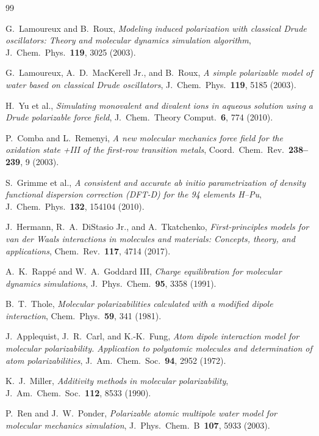 \documentclass[11pt,letterpaper]{article}
\begin{document}

\begin{thebibliography}{99}

G.~Lamoureux and B.~Roux,
\textit{Modeling induced polarization with classical Drude oscillators: Theory and molecular dynamics simulation algorithm},
J.~Chem.~Phys.~\textbf{119}, 3025 (2003).

G.~Lamoureux, A.~D.~MacKerell Jr., and B.~Roux,
\textit{A simple polarizable model of water based on classical Drude oscillators},
J.~Chem.~Phys.~\textbf{119}, 5185 (2003).

H.~Yu et al.,
\textit{Simulating monovalent and divalent ions in aqueous solution using a Drude polarizable force field},
J.~Chem.~Theory Comput.~\textbf{6}, 774 (2010).

P.~Comba and L.~Remenyi,
\textit{A new molecular mechanics force field for the oxidation state +III of the first-row transition metals},
Coord.~Chem.~Rev.~\textbf{238--239}, 9 (2003).

S.~Grimme et al.,
\textit{A consistent and accurate ab initio parametrization of density functional dispersion correction (DFT-D) for the 94 elements H--Pu},
J.~Chem.~Phys.~\textbf{132}, 154104 (2010).

J.~Hermann, R.~A.~DiStasio Jr., and A.~Tkatchenko,
\textit{First-principles models for van der Waals interactions in molecules and materials: Concepts, theory, and applications},
Chem.~Rev.~\textbf{117}, 4714 (2017).

A.~K.~Rapp\'{e} and W.~A.~Goddard III,
\textit{Charge equilibration for molecular dynamics simulations},
J.~Phys.~Chem.~\textbf{95}, 3358 (1991).

B.~T.~Thole,
\textit{Molecular polarizabilities calculated with a modified dipole interaction},
Chem.~Phys.~\textbf{59}, 341 (1981).

J.~Applequist, J.~R.~Carl, and K.-K.~Fung,
\textit{Atom dipole interaction model for molecular polarizability. Application to polyatomic molecules and determination of atom polarizabilities},
J.~Am.~Chem.~Soc.~\textbf{94}, 2952 (1972).

K.~J.~Miller,
\textit{Additivity methods in molecular polarizability},
J.~Am.~Chem.~Soc.~\textbf{112}, 8533 (1990).

P.~Ren and J.~W.~Ponder,
\textit{Polarizable atomic multipole water model for molecular mechanics simulation},
J.~Phys.~Chem.~B~\textbf{107}, 5933 (2003).

\end{thebibliography}
\end{document}
